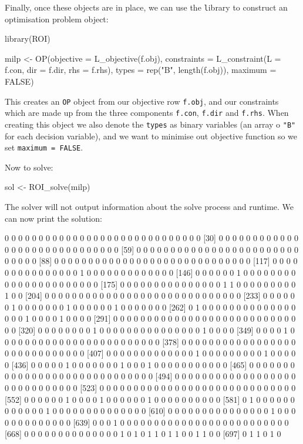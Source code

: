 Finally, once these objects are in place, we can use the \texttt library to construct an optimisation problem object:

\begin{Rin}
library(ROI)

milp <- OP(objective = L_objective(f.obj),
           constraints = L_constraint(L = f.con,
                                      dir = f.dir,
                                      rhs = f.rhs),
           types = rep("B", length(f.obj)), 
           maximum = FALSE)
\end{Rin}

This creates an \texttt{OP} object from our objective row \texttt{f.obj}, and our constraints which are made up from the three components \texttt{f.con}, \texttt{f.dir} and \texttt{f.rhs}.
When creating this object we also denote the \texttt{types} as binary variables (an array o \texttt{"B"} for each decision variable), and we want to minimise out objective function so we set \texttt{maximum = FALSE}.

Now to solve:

\begin{Rin}
sol <- ROI_solve(milp)
\end{Rin}

The solver will not output information about the solve process and runtime.
We can now print the solution:


\begin{Rout}
  [1] 0 0 0 0 0 0 0 0 0 0 0 0 0 0 0 0 0 0 0 0 0 0 0 0 0 0 0 0 0
 [30] 0 0 0 0 0 0 0 0 0 0 0 0 0 0 0 0 0 0 0 0 0 0 0 0 0 0 0 0 0
 [59] 0 0 0 0 0 0 0 0 0 0 0 0 0 0 0 0 0 0 0 0 0 0 0 0 0 0 0 0 0
 [88] 0 0 0 0 0 0 0 0 0 0 0 0 0 0 0 0 0 0 0 0 0 0 0 0 0 0 0 0 0
[117] 0 0 0 0 0 0 0 0 0 0 0 0 0 0 0 1 0 0 0 0 0 0 0 0 0 0 0 0 0
[146] 0 0 0 0 0 0 1 0 0 0 0 0 0 0 0 0 0 0 0 0 0 0 0 0 0 0 0 0 0
[175] 0 0 0 0 0 0 0 0 0 0 0 0 0 0 0 1 1 0 0 0 0 0 0 0 0 0 1 0 0
[204] 0 0 0 0 0 0 0 0 0 0 0 0 0 0 0 0 0 0 0 0 0 0 0 0 0 0 0 0 0
[233] 0 0 0 0 0 0 1 0 0 0 0 0 0 0 1 0 0 0 0 0 0 1 0 0 0 0 0 0 0
[262] 0 1 0 0 0 0 0 0 0 0 0 0 0 0 0 0 0 0 0 1 0 0 0 0 1 0 0 0 0
[291] 0 0 0 0 0 0 0 0 0 0 0 0 0 0 0 0 0 0 0 0 0 0 0 0 0 0 0 0 0
[320] 0 0 0 0 0 0 0 0 1 0 0 0 0 0 0 0 0 0 0 0 0 0 0 0 1 0 0 0 0
[349] 0 0 0 0 1 0 0 0 0 0 0 0 0 0 0 0 0 0 0 0 0 0 0 0 0 0 0 0 0
[378] 0 0 0 0 0 0 0 0 0 0 0 0 0 0 0 0 0 0 0 0 0 0 0 0 0 0 0 0 0
[407] 0 0 0 0 0 0 0 0 0 0 0 0 0 1 0 0 0 0 0 0 0 0 0 1 0 0 0 0 0
[436] 0 0 0 0 0 1 0 0 0 0 0 0 0 1 0 0 0 1 0 0 0 0 0 0 0 0 0 0 0
[465] 0 0 0 0 0 0 0 0 0 0 0 0 0 0 0 0 0 0 0 0 0 0 0 0 0 0 0 0 0
[494] 0 0 0 0 0 0 0 0 0 0 0 0 0 0 0 0 0 0 0 0 0 0 0 0 0 0 0 0 0
[523] 0 0 0 0 0 0 0 0 0 0 0 0 0 0 0 0 0 0 0 0 0 0 0 0 0 0 0 0 0
[552] 0 0 0 0 0 0 1 0 0 0 0 1 0 0 0 0 0 0 1 0 0 0 0 0 0 0 0 0 0
[581] 0 1 0 0 0 0 0 0 0 0 0 0 0 0 1 0 0 0 0 0 0 0 0 0 0 0 0 0 0
[610] 0 0 0 0 0 0 0 0 0 0 0 0 0 0 0 1 0 0 0 0 0 0 0 0 0 0 0 0 0
[639] 0 0 0 1 0 0 0 0 0 0 0 0 0 0 0 0 0 0 0 0 0 0 0 0 0 0 0 0 0
[668] 0 0 0 0 0 0 0 0 0 0 0 0 0 0 1 0 1 0 1 1 0 1 1 0 0 1 1 0 0
[697] 0 1 1 0 1 0
\end{Rout}

